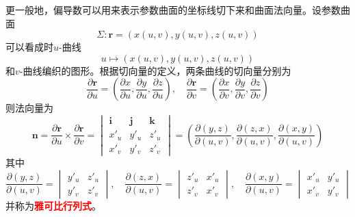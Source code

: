更一般地，偏导数可以用来表示参数曲面的坐标线切下来和曲面法向量。设参数曲面
\[ \Sigma : \bm{r}=(x(u,v),y(u,v),z(u,v)) \]
可以看成时$u$-曲线
\[ u \mapsto (x(u,v),y(u,v),z(u,v)) \]
和$v$-曲线编织的图形。根据切向量的定义，两条曲线的切向量分别为
\[
    \frac{\partial\bm{r}}{\partial u} = \left(\frac{\partial x}{\partial u}, \frac{\partial y}{\partial u}, \frac{\partial z}{\partial u}\right)
    ,\quad
    \frac{\partial\bm{r}}{\partial v} = \left(\frac{\partial x}{\partial v}, \frac{\partial y}{\partial v}, \frac{\partial z}{\partial v}\right)
\]
则法向量为
\begin{equation}
    \bm{n} = \frac{\partial\bm{r}}{\partial u} \times \frac{\partial\bm{r}}{\partial v} =
    \begin{vmatrix}
        \bm{i} & \bm{j} & \bm{k} \\
        x'_u   & y'_u   & z'_u   \\
        x'_v   & y'_v   & z'_v
    \end{vmatrix}
    =
    \left(\frac{\partial(y,z)}{\partial(u,v)},\frac{\partial(z,x)}{\partial(u,v)}, \frac{\partial(x,y)}{\partial(u,v)}\right)
\end{equation}
其中
\[
    \frac{\partial(y,z)}{\partial(u,v)} =
    \begin{vmatrix}
        y'_u & z'_u \\
        y'_v & z'_v
    \end{vmatrix},\quad
    \frac{\partial(z,x)}{\partial(u,v)} =
    \begin{vmatrix}
        z'_u & x'_u \\
        z'_v & x'_v
    \end{vmatrix},\quad
    \frac{\partial(x,y)}{\partial(u,v)} =
    \begin{vmatrix}
        x'_u & y'_u \\
        x'_v & y'_v
    \end{vmatrix}
\]
并称为\textcolor{red}{\textbf{\textsf{雅可比行列式}}}。

